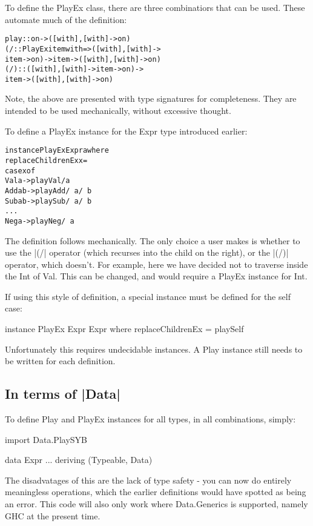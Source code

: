 \documentclass[preprint]{sigplanconf}
\newenvironment{code}{\begin{alltt}\small}{\end{alltt}}
\begin{document}
To define the PlayEx class, there are three combinatiors that can be used. These automate much of the definition:

\begin{code}
play :: on -> ([with],[with] -> on)
(/\) :: PlayEx item with => ([with], [with] ->
    item -> on) -> item -> ([with], [with] -> on)
(/\!) :: ([with], [with] -> item -> on) ->
    item -> ([with], [with] -> on)
\end{code}

Note, the above are presented with type signatures for completeness. They are intended to be used mechanically, without excessive thought.

To define a PlayEx instance for the Expr type introduced earlier:

\begin{code}
instance PlayEx Expr a where
    replaceChildrenEx x =
        case x of
            Val a -> play Val /\! a
            Add a b -> play Add /\ a /\ b
            Sub a b -> play Sub /\ a /\ b
            ...
            Neg a -> play Neg /\ a
\end{code}

The definition follows mechanically. The only choice a user makes is whether to use the |(/\)| operator (which recurses into the child on the right), or the |(/\!)| operator, which doesn't. For example, here we have decided not to traverse inside the Int of Val. This can be changed, and would require a PlayEx instance for Int.

If using this style of definition, a special instance must be defined for the self case:

instance PlayEx Expr Expr where
    replaceChildrenEx = playSelf

Unfortunately this requires undecidable instances. A Play instance still needs to be written for each definition.


\subsection{In terms of |Data|}

 To define Play and PlayEx instances for all types, in all combinations, simply:

import Data.PlaySYB

data Expr ... deriving (Typeable, Data)

The disadvatages of this are the lack of type safety - you can now do entirely meaningless operations, which the earlier definitions would have spotted as being an error. This code will also only work where Data.Generics is supported, namely GHC at the present time.
\end{document}

